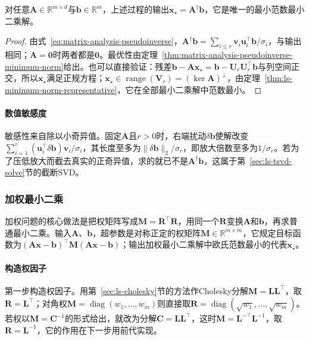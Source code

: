 \begin{theorem}
\label{thm:ls-svd-solve}
对任意$\bm A\in\mathbb R^{m\times d}$与$\bm b\in\mathbb R^m$，上述过程的输出$\bm x_\star=\bm A^\dagger\bm b$，它是唯一的最小范数最小二乘解。
\end{theorem}
\begin{proof}
由式~\eqref{eq:matrix-analysis-pseudoinverse}，$\bm A^\dagger\bm b=\sum_{i\leq r}\bm v_i\bm u_i^\top\bm b/\sigma_i$，与输出相同；$\bm A=\bm0$时两者都是$\bm0$。最优性由定理~\ref{thm:matrix-analysis-pseudoinverse-minimum-norm}给出。也可以直接验证：残差$\bm b-\bm A\bm x_\star=\bm b-\bm U_r\bm U_r^\top\bm b$与列空间正交，所以$\bm x_\star$满足正规方程；$\bm x_\star\in\operatorname{range}(\bm V_r)=(\ker\bm A)^\perp$，由定理~\ref{thm:ls-minimum-norm-representative}，它在全部最小二乘解中范数最小。
\end{proof}

\paragraph{数值敏感度}
敏感性来自除以小奇异值。固定$\bm A$且$r>0$时，右端扰动$\delta\bm b$使解改变$\sum_{i=1}^r(\bm u_i^\top\delta\bm b)\bm v_i/\sigma_i$，其长度至多为$\lVert\delta\bm b\rVert_2/\sigma_r$，即放大倍数至多为$1/\sigma_r$。若为了压低放大而截去真实的正奇异值，求的就已不是$\bm A^\dagger\bm b$，这属于第~\ref{sec:ls-tsvd-solve}节的截断SVD。

\subsubsection{加权最小二乘}

加权问题的核心做法是把权矩阵写成$\bm M=\bm R^\top\bm R$，用同一个$\bm R$变换$\bm A$和$\bm b$，再求普通最小二乘。输入$\bm A$、$\bm b$，超参数是对称正定的权矩阵$\bm M\in\mathbb R^{m\times m}$，它规定目标函数为$(\bm A\bm x-\bm b)^\top\bm M(\bm A\bm x-\bm b)$；输出加权最小二乘解中欧氏范数最小的代表$\bm x_\star$。

\paragraph{构造权因子}
第一步构造权因子。用第~\ref{sec:ls-cholesky}节的方法作Cholesky分解$\bm M=\bm L\bm L^\top$，取$\bm R=\bm L^\top$；对角权$\bm M=\operatorname{diag}(w_1,\ldots,w_m)$则直接取$\bm R=\operatorname{diag}(\sqrt{w_1},\ldots,\sqrt{w_m})$。若权以$\bm M=\bm C^{-1}$的形式给出，就改为分解$\bm C=\bm L\bm L^\top$，这时$\bm M=\bm L^{-\top}\bm L^{-1}$，取$\bm R=\bm L^{-1}$，它的作用在下一步用前代实现。

